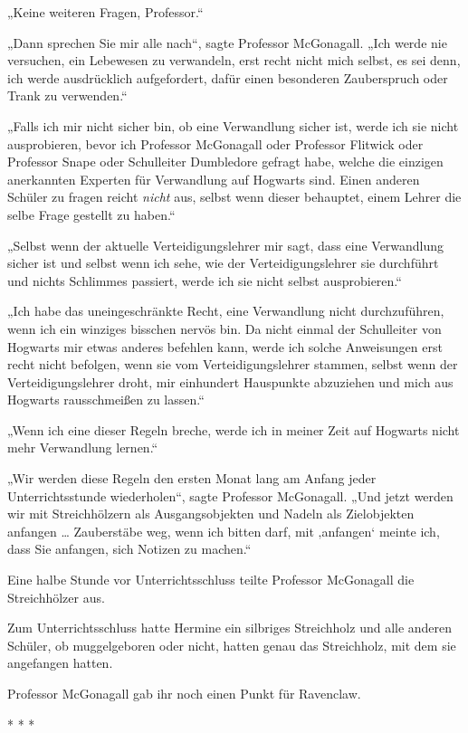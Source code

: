 {„Keine weiteren Fragen, Professor.“

„Dann sprechen Sie mir alle nach“, sagte Professor McGonagall. „Ich werde nie versuchen, ein Lebewesen zu verwandeln, erst recht nicht mich selbst, es sei denn, ich werde ausdrücklich aufgefordert, dafür einen besonderen Zauberspruch oder Trank zu verwenden.“

„Falls ich mir nicht sicher bin, ob eine Verwandlung sicher ist, werde ich sie nicht ausprobieren, bevor ich Professor McGonagall oder Professor Flitwick oder Professor Snape oder Schulleiter Dumbledore gefragt habe, welche die einzigen anerkannten Experten für Verwandlung auf Hogwarts sind. Einen anderen Schüler zu fragen reicht \emph{nicht} aus, selbst wenn dieser behauptet, einem Lehrer die selbe Frage gestellt zu haben.“

„Selbst wenn der aktuelle Verteidigungslehrer mir sagt, dass eine Verwandlung sicher ist und selbst wenn ich sehe, wie der Verteidigungslehrer sie durchführt und nichts Schlimmes passiert, werde ich sie nicht selbst ausprobieren.“

„Ich habe das uneingeschränkte Recht, eine Verwandlung nicht durchzuführen, wenn ich ein winziges bisschen nervös bin. Da nicht einmal der Schulleiter von Hogwarts mir etwas anderes befehlen kann, werde ich solche Anweisungen erst recht nicht befolgen, wenn sie vom Verteidigungslehrer stammen, selbst wenn der Verteidigungslehrer droht, mir einhundert Hauspunkte abzuziehen und mich aus Hogwarts rausschmeißen zu lassen.“

„Wenn ich eine dieser Regeln breche, werde ich in meiner Zeit auf Hogwarts nicht mehr Verwandlung lernen.“

„Wir werden diese Regeln den ersten Monat lang am Anfang jeder Unterrichtsstunde wiederholen“, sagte Professor McGonagall. „Und jetzt werden wir mit Streichhölzern als Ausgangsobjekten und Nadeln als Zielobjekten anfangen … Zauberstäbe weg, wenn ich bitten darf, mit ‚anfangen` meinte ich, dass Sie anfangen, sich Notizen zu machen.“

Eine halbe Stunde vor Unterrichtsschluss teilte Professor McGonagall die Streichhölzer aus.

Zum Unterrichtsschluss hatte Hermine ein silbriges Streichholz und alle anderen Schüler, ob muggelgeboren oder nicht, hatten genau das Streichholz, mit dem sie angefangen hatten.

Professor McGonagall gab ihr noch einen Punkt für Ravenclaw.

* * *

}
